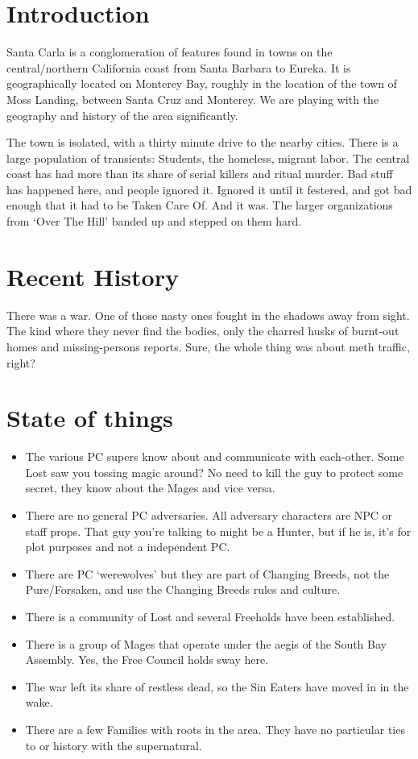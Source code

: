 \section{Introduction}
Santa Carla is a conglomeration of features found in towns on the central/northern California coast from Santa Barbara to Eureka.
It is geographically located on Monterey Bay, roughly in the location of the town of Moss Landing, between Santa Cruz and Monterey.
We are playing with the geography and history of the area significantly.

The town is isolated, with a thirty minute drive to the nearby cities.
There is a large population of transients: Students, the homeless, migrant labor.
The central coast has had more than its share of serial killers and ritual murder.
Bad stuff has happened here, and people ignored it.
Ignored it until it festered, and got bad enough that it had to be Taken Care Of.
And it was.
The larger organizations from `Over The Hill' banded up and stepped on them hard.
\section{Recent History}
There was a war.
One of those nasty ones fought in the shadows away from sight.
The kind where they never find the bodies, only the charred husks of burnt-out homes and missing-persons reports.
Sure, the whole thing was about meth traffic, right?
\section{State of things}

\begin{itemize}
\item The various PC supers know about and communicate with each-other. Some Lost saw you tossing magic around? No need to kill the guy to protect some secret, they know about the Mages and vice versa.
\item There are no general PC adversaries. All adversary characters are NPC or staff props. That guy you're talking to might be a Hunter, but if he is, it's for plot purposes and not a independent PC.
\item There are PC `werewolves' but they are part of Changing Breeds, not the Pure/Forsaken, and use the Changing Breeds rules and culture.
\item There is a community of Lost and several Freeholds have been established.
\item There is a group of Mages that operate under the aegis of the South Bay Assembly. Yes, the Free Council holds sway here.
\item The war left its share of restless dead, so the Sin Eaters have moved in in the wake.
\item There are a few Families with roots in the area. They have no particular ties to or history with the supernatural.
\end{itemize}
